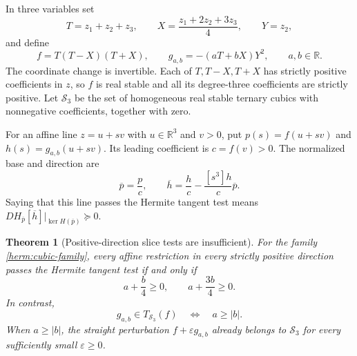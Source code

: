 \documentclass[reqno]{amsart}
\newtheorem{theorem}{Theorem}[section]
\theoremstyle{definition}
\theoremstyle{remark}
\newcommand{\R}{\mathbb R}
\begin{document}
In three variables set
\begin{equation}
 T=z_1+z_2+z_3,\qquad
 X=\frac{z_1+2z_2+3z_3}{4},\qquad Y=z_2,
 \label{herm:cubic-coordinates}
\end{equation}
and define
\begin{equation}
 f=T(T-X)(T+X),\qquad
 g_{a,b}=-(aT+bX)Y^2,\qquad a,b\in\R.
 \label{herm:cubic-family}
\end{equation}
The coordinate change is invertible.  Each of $T,T-X,T+X$ has strictly
positive coefficients in $z$, so $f$ is real stable and all its
degree-three coefficients are strictly positive.  Let $\mathcal S_3$
be the set of homogeneous real stable ternary cubics with nonnegative
coefficients, together with zero.

For an affine line $z=u+sv$ with $u\in\R^3$ and $v>0$, put
$p(s)=f(u+sv)$ and $h(s)=g_{a,b}(u+sv)$.  Its leading coefficient is
$c=f(v)>0$.  The normalized base and direction are
\begin{equation}
 \overline p=\frac pc,\qquad
 \overline h=\frac hc-\frac{[s^3]h}{c}\overline p.
 \label{herm:normalized-slice}
\end{equation}
Saying that this line passes the Hermite tangent test means
$DH_{\overline p}[\overline h]|_{\ker H(\overline p)}\succeq0$.

\begin{theorem}[Positive-direction slice tests are insufficient]
\label{herm:cubic-slices}
For the family \eqref{herm:cubic-family}, every affine restriction in
every strictly positive direction passes the Hermite tangent test if
and only if
\begin{equation}
 a+\frac b4\geq0,
 \qquad a+\frac{3b}{4}\geq0.
 \label{herm:cubic-slice-cone}
\end{equation}
In contrast,
\begin{equation}
 g_{a,b}\in T_{\mathcal S_3}(f)
       \quad\Longleftrightarrow\quad a\geq|b|.
 \label{herm:cubic-true-cone}
\end{equation}
When $a\geq|b|$, the straight perturbation $f+\varepsilon g_{a,b}$
already belongs to $\mathcal S_3$ for every sufficiently small
$\varepsilon\geq0$.
\end{theorem}
\end{document}

